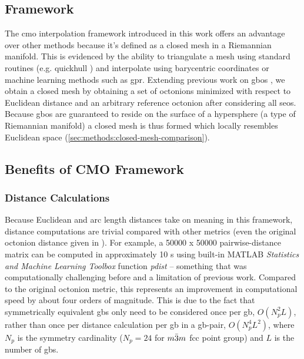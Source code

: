 \documentclass[preprint,12pt]{elsarticle}
\begin{document}
\subsection{ Framework}
The \gls{cmo} interpolation framework introduced in this work offers an advantage over other methods because it's defined as a closed mesh in a Riemannian manifold. This is evidenced by the ability to triangulate a mesh using standard routines (e.g. quickhull \cite{barberQuickhullAlgorithmConvex1996}) and interpolate using barycentric coordinates or machine learning methods such as \gls{gpr}. Extending previous work on \glspl{gbo} \cite{francisGeodesicOctonionMetric2019,chesserLearningGrainBoundary2020}, we obtain a closed mesh by obtaining a set of octonions minimized with respect to Euclidean distance and an arbitrary reference octonion after considering all \glspl{seo}. Because \glspl{gbo} are guaranteed to reside on the surface of a hypersphere \cite{francisGeodesicOctonionMetric2019} (a type of Riemannian manifold) a closed mesh is thus formed which locally resembles Euclidean space (\ref{sec:methods:closed-mesh-comparison}).

\subsection{Benefits of CMO Framework}
\subsubsection{Distance Calculations}
Because Euclidean and arc length distances take on meaning in this framework, distance computations are trivial compared with other metrics (even the original octonion distance given in \cite{francisGeodesicOctonionMetric2019}). For example, a \num{50000} x \num{50000} pairwise-distance matrix can be computed in approximately 10 s using built-in MATLAB \textit{Statistics and Machine Learning Toolbox} function \textit{pdist} -- something that was computationally challenging before and a limitation of previous work. Compared to the original octonion metric, this represents an improvement in computational speed by about four orders of magnitude. This is due to the fact that symmetrically equivalent \glspl{gb} only need to be considered once per \gls{gb}, $O(N_p^2L)$, rather than once per distance calculation per \gls{gb} in a \gls{gb}-pair, $O(N_p^4L^2)$, where $N_p$ is the symmetry cardinality ($N_p=24$ for $m\Bar{3}m$ \gls{fcc} point group) and $L$ is the number of \glspl{gb}. %
\end{document}
